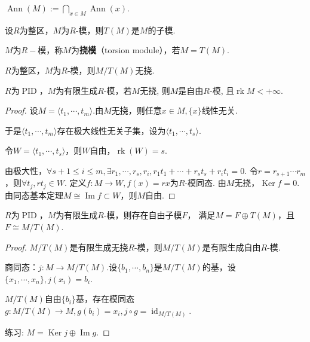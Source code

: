     \begin{definition}
        $\operatorname{Ann}(M):=\bigcap\limits_{x\in M}\operatorname{Ann}(x).$
    \end{definition}
    \begin{proposition}
        设$R$为整区，$M$为$R$-模，则$T(M)$是$M$的子模.
    \end{proposition}
    \begin{definition}
        $M$为$R-$模，称$M$为\textbf{挠模}（torsion module），若$M=T(M)$.
    \end{definition}
    \begin{proposition}
        $R$为整区，$M$为$R$-模，则$M/T(M)$无挠.

    \end{proposition}
    \begin{proposition}
        $R$为$\operatorname{PID}$，$M$为有限生成$R$-模，若$M$无挠, 则$M$是自由$R$-模, 且$\operatorname{rk} M<+\infty$.
    \end{proposition}
\begin{proof}
	
	设$M=\langle  t_1,\cdots,t_m\rangle$.由$M$无挠，则任意$x\in M,\{x\}$线性无关.
	
	于是$\langle  t_1,\cdots,t_m\rangle$存在极大线性无关子集，设为$\langle  t_1,\cdots,t_s\rangle$.
	
	令$W=\langle  t_1,\cdots,t_s\rangle$，则$W$自由，$\operatorname{rk}(W)=s$.
	
	由极大性，$\forall s+1\leq i\leq m,\exists r_1,\cdots,r_s,r_i,r_1t_1+\cdots+r_st_s+r_it_i=0$.
    令$r=r_{s+1}\cdots r_m$，则$\forall t_j,rt_j\in W $.
    定义$f:M\rightarrow W,f(x)=rx$为$R$-模同态.
    由$M$无挠，$\operatorname{Ker}f=0$.
    由同态基本定理$M\cong \operatorname{Im}f\subset W$，则$M$自由.
\end{proof}
    \begin{theorem}
        $R$为$\operatorname{PID}$，$M$为有限生成$R$-模，则存在自由子模$F$，
        满足$M=F\oplus T(M)$，且$F\cong M/T(M)$.
    \end{theorem}
\begin{proof}
	$M/T(M)$是有限生成无挠$R$-模，则$M/T(M)$是有限生成自由$R$-模.
	
	商同态：$j:M\rightarrow M/T(M)$.设$\{b_1,\cdots,b_n\}$是$M/T(M)$的基，设$\{x_1,\cdots,x_n\},j(x_i)=b_i$.
	
	$M/T(M)$自由$\{b_i\}$基，存在模同态$g:M/T(M)\rightarrow M,g(b_i)=x_i,j\circ g=\operatorname{id}_{M/T(M)}$.
	
	练习: $M=\operatorname{Ker}j\oplus \operatorname{Im}g$.
\end{proof}
